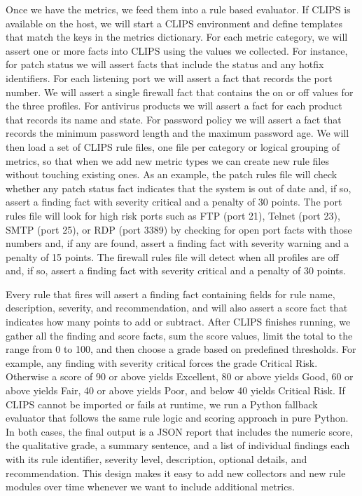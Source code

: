 \documentclass[conference, letterpaper]{IEEEtran}
\begin{document}
    Once we have the metrics, we feed them into a rule based evaluator. If CLIPS is available on the host, we will start a CLIPS environment and define templates that match the keys in the metrics dictionary. For each metric category, we will assert one or more facts into CLIPS using the values we collected. For instance, for patch status we will assert facts that include the status and any hotfix identifiers. For each listening port we will assert a fact that records the port number. We will assert a single firewall fact that contains the on or off values for the three profiles. For antivirus products we will assert a fact for each product that records its name and state. For password policy we will assert a fact that records the minimum password length and the maximum password age. We will then load a set of CLIPS rule files, one file per category or logical grouping of metrics, so that when we add new metric types we can create new rule files without touching existing ones. As an example, the patch rules file will check whether any patch status fact indicates that the system is out of date and, if so, assert a finding fact with severity critical and a penalty of 30 points. The port rules file will look for high risk ports such as FTP (port 21), Telnet (port 23), SMTP (port 25), or RDP (port 3389) by checking for open port facts with those numbers and, if any are found, assert a finding fact with severity warning and a penalty of 15 points. The firewall rules file will detect when all profiles are off and, if so, assert a finding fact with severity critical and a penalty of 30 points.
    
    Every rule that fires will assert a finding fact containing fields for rule name, description, severity, and recommendation, and will also assert a score fact that indicates how many points to add or subtract. After CLIPS finishes running, we gather all the finding and score facts, sum the score values, limit the total to the range from 0 to 100, and then choose a grade based on predefined thresholds. For example, any finding with severity critical forces the grade Critical Risk. Otherwise a score of 90 or above yields Excellent, 80 or above yields Good, 60 or above yields Fair, 40 or above yields Poor, and below 40 yields Critical Risk. If CLIPS cannot be imported or fails at runtime, we run a Python fallback evaluator that follows the same rule logic and scoring approach in pure Python. In both cases, the final output is a JSON report that includes the numeric score, the qualitative grade, a summary sentence, and a list of individual findings each with its rule identifier, severity level, description, optional details, and recommendation. This design makes it easy to add new collectors and new rule modules over time whenever we want to include additional metrics.
\end{document}
